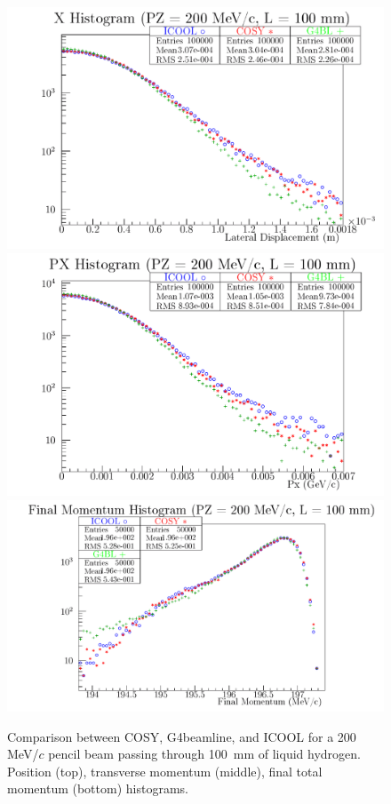 \documentclass{jacow}
\begin{document}
\begin{figure}[!h]
\centering
\includegraphics[width=\columnwidth]{Figures/LH.X.200.100.png}
\includegraphics[width=\columnwidth]{Figures/LH.PX.200.100.png}
\includegraphics[width=\columnwidth]{Figures/LH.strag.200.100.png}
\caption{Comparison between COSY, G4beamline, and ICOOL for a 200 MeV/$c$ pencil beam passing through 100~mm of liquid hydrogen. Position (top), transverse momentum (middle), final total momentum (bottom) histograms.}
\label{fig:LH_validation}
\end{figure}
\end{document}
